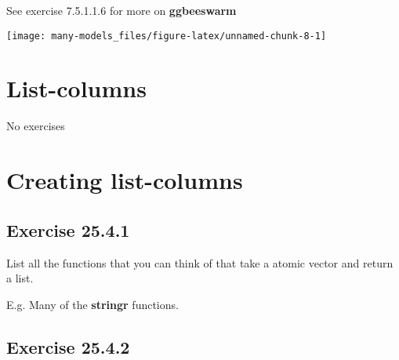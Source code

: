 \documentclass[]{book}
\newenvironment{Shaded}{\begin{snugshade}}{\end{snugshade}}
\newcommand{\DataTypeTok}[1]{\textcolor[rgb]{0.13,0.29,0.53}{#1}}
\newcommand{\KeywordTok}[1]{\textcolor[rgb]{0.13,0.29,0.53}{\textbf{#1}}}
\newcommand{\NormalTok}[1]{#1}
\newcommand{\OperatorTok}[1]{\textcolor[rgb]{0.81,0.36,0.00}{\textbf{#1}}}
\newcommand{\OtherTok}[1]{\textcolor[rgb]{0.56,0.35,0.01}{#1}}
\newcommand{\StringTok}[1]{\textcolor[rgb]{0.31,0.60,0.02}{#1}}
\theoremstyle{plain}
\theoremstyle{remark}
\theoremstyle{definition}
\theoremstyle{definition}
\theoremstyle{definition}
\theoremstyle{remark}
\begin{document}
See exercise 7.5.1.1.6 for more on \textbf{ggbeeswarm}

\begin{Shaded}
\end{Shaded}

\begin{center}\texttt{[image: many-models\_files/figure-latex/unnamed-chunk-8-1]} \end{center}

\hypertarget{list-columns}{%
\section{List-columns}\label{list-columns}}

No exercises

\hypertarget{creating-list-columns}{%
\section{Creating list-columns}\label{creating-list-columns}}

\hypertarget{exercise-25.4.1}{%
\subsection*{\texorpdfstring{Exercise
{25.4.1}}{Exercise 25.4.1}}\label{exercise-25.4.1}}

List all the functions that you can think of that take a atomic vector
and return a list.

E.g. Many of the \textbf{stringr} functions.

\hypertarget{exercise-25.4.2}{%
\subsection*{\texorpdfstring{Exercise
{25.4.2}}{Exercise 25.4.2}}\label{exercise-25.4.2}}
\end{document}
